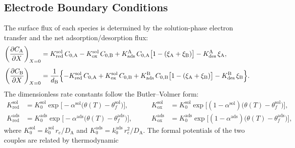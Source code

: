 \subsection{Electrode Boundary Conditions}

The surface flux of each species is determined by the solution-phase
electron transfer and the net adsorption/desorption flux:
\begin{equation}\label{eq:ads-bc}
  \begin{aligned}
    \left(\frac{\partial C_\mathrm{A}}{\partial X}\right)_{X=0}
    &= K_{\mathrm{red}}^{\mathrm{sol}}\,C_{0,\mathrm{A}}
    - K_{\mathrm{ox}}^{\mathrm{sol}}\,C_{0,\mathrm{B}}
    + K_{\mathrm{ads}}^{\mathrm{A}}\,C_{0,\mathrm{A}}
    \bigl[1 - (\xi_\mathrm{A} + \xi_\mathrm{B})\bigr]
    - K_{\mathrm{des}}^{\mathrm{A}}\,\xi_\mathrm{A}, \\[4pt]
    \left(\frac{\partial C_\mathrm{B}}{\partial X}\right)_{X=0}
    &= \frac{1}{d_\mathrm{B}}\Bigl\{
      -K_{\mathrm{red}}^{\mathrm{sol}}\,C_{0,\mathrm{A}}
      + K_{\mathrm{ox}}^{\mathrm{sol}}\,C_{0,\mathrm{B}}
      + K_{\mathrm{ads}}^{\mathrm{B}}\,C_{0,\mathrm{B}}
      \bigl[1 - (\xi_\mathrm{A} + \xi_\mathrm{B})\bigr]
      - K_{\mathrm{des}}^{\mathrm{B}}\,\xi_\mathrm{B}
    \Bigr\}.
  \end{aligned}
\end{equation}
The dimensionless rate constants follow the Butler--Volmer form:
\begin{equation}\label{eq:ads-kred-kox}
  \begin{aligned}
    K_{\mathrm{red}}^{\mathrm{sol}}
    &= K_0^{\mathrm{sol}}
    \exp\!\bigl[-\alpha^{\mathrm{sol}}\bigl(\theta(T) -
    \theta_f^{\mathrm{sol}}\bigr)\bigr],
    &\qquad
    K_{\mathrm{ox}}^{\mathrm{sol}}
    &= K_0^{\mathrm{sol}}
    \exp\!\bigl[(1-\alpha^{\mathrm{sol}})\bigl(\theta(T) -
    \theta_f^{\mathrm{sol}}\bigr)\bigr],
    \\[4pt]
    K_{\mathrm{red}}^{\mathrm{ads}}
    &= K_0^{\mathrm{ads}}
    \exp\!\bigl[-\alpha^{\mathrm{ads}}\bigl(\theta(T) -
    \theta_f^{\mathrm{ads}}\bigr)\bigr],
    &\qquad
    K_{\mathrm{ox}}^{\mathrm{ads}}
    &= K_0^{\mathrm{ads}}
    \exp\!\bigl[(1-\alpha^{\mathrm{ads}})\bigl(\theta(T) -
    \theta_f^{\mathrm{ads}}\bigr)\bigr],
  \end{aligned}
\end{equation}
where $K_0^{\mathrm{sol}} = k_0^{\mathrm{sol}}\,r_e/ D_\mathrm{A}$
and $K_0^{\mathrm{ads}} = k_0^{\mathrm{ads}}\,r_e^2 / D_\mathrm{A}$.
The formal potentials of the two couples are related by thermodynamic
